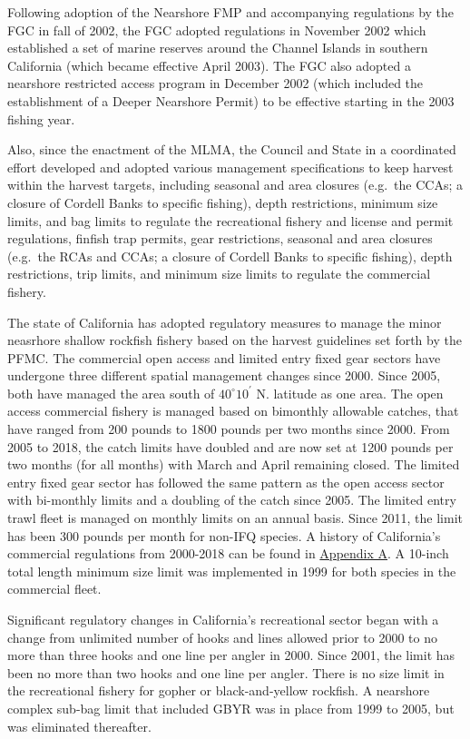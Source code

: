 \documentclass[12pt,]{article}
\begin{document}
Following adoption of the Nearshore FMP and accompanying regulations by
the FGC in fall of 2002, the FGC adopted regulations in November 2002
which established a set of marine reserves around the Channel Islands in
southern California (which became effective April 2003). The FGC also
adopted a nearshore restricted access program in December 2002 (which
included the establishment of a Deeper Nearshore Permit) to be effective
starting in the 2003 fishing year.

Also, since the enactment of the MLMA, the Council and State in a
coordinated effort developed and adopted various management
specifications to keep harvest within the harvest targets, including
seasonal and area closures (e.g.~the CCAs; a closure of Cordell Banks to
specific fishing), depth restrictions, minimum size limits, and bag
limits to regulate the recreational fishery and license and permit
regulations, finfish trap permits, gear restrictions, seasonal and area
closures (e.g.~the RCAs and CCAs; a closure of Cordell Banks to specific
fishing), depth restrictions, trip limits, and minimum size limits to
regulate the commercial fishery.

The state of California has adopted regulatory measures to manage the
minor neasrhore shallow rockfish fishery based on the harvest guidelines
set forth by the PFMC. The commercial open access and limited entry
fixed gear sectors have undergone three different spatial management
changes since 2000. Since 2005, both have managed the area south of
\(40^\circ 10^\prime\) N. latitude as one area. The open access
commercial fishery is managed based on bimonthly allowable catches, that
have ranged from 200 pounds to 1800 pounds per two months since 2000.
From 2005 to 2018, the catch limits have doubled and are now set at 1200
pounds per two months (for all months) with March and April remaining
closed. The limited entry fixed gear sector has followed the same
pattern as the open access sector with bi-monthly limits and a doubling
of the catch since 2005. The limited entry trawl fleet is managed on
monthly limits on an annual basis. Since 2011, the limit has been 300
pounds per month for non-IFQ species. A history of California's
commercial regulations from 2000-2018 can be found in
\protect\hyperlink{appendix-a.-californias-commercial-fishery-regulations}{Appendix
A}. A 10-inch total length minimum size limit was implemented in 1999
for both species in the commercial fleet.

Significant regulatory changes in California's recreational sector began
with a change from unlimited number of hooks and lines allowed prior to
2000 to no more than three hooks and one line per angler in 2000. Since
2001, the limit has been no more than two hooks and one line per angler.
There is no size limit in the recreational fishery for gopher or
black-and-yellow rockfish. A nearshore complex sub-bag limit that
included GBYR was in place from 1999 to 2005, but was eliminated
thereafter.
\end{document}
